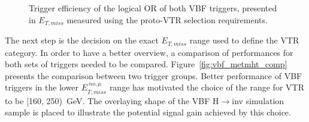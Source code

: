 \begin{figure}[htbp]
  \centering
  \caption{Trigger efficiency of the logical OR of both VBF triggers, presented in $E_{T,miss}$ measured using the proto-VTR selection requirements.}
  \label{fig:vbf_proto_trig_eff}
\end{figure}

\hspace{10pt} The next step is the decision on the exact $E_{T,miss}$ range used to define the VTR category. In order to have a better overview, a comparison of performances for both sets of triggers needed to be compared. Figure~\ref{fig:vbf_metmht_comp} presents the comparison between two trigger groups. Better performance of VBF triggers in the lower $E_{T,miss}^{~no, \mu}$ range has motivated the choice of the range for VTR to be [160, 250)~GeV. The overlaying shape of the VBF H$\rightarrow$inv simulation sample is placed to illustrate the potential signal gain achieved by this choice.

